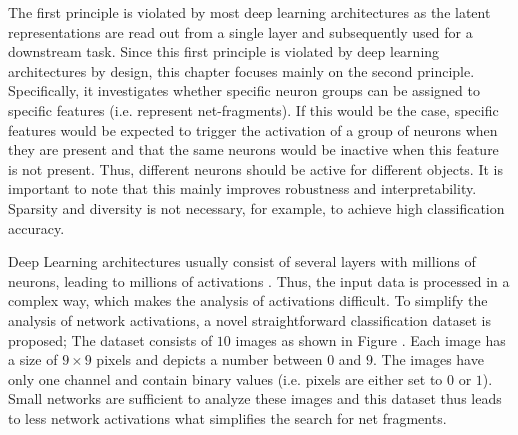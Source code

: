 
The first principle is violated by most deep learning architectures as the latent representations are read out from a single layer and subsequently used for a downstream task.
Since this first principle is violated by deep learning architectures by design, this chapter focuses mainly on the second principle. Specifically, it investigates whether specific neuron groups can be assigned to specific features (i.e. represent net-fragments). 
If this would be the case, specific features would be expected to trigger the activation of a group of neurons when they are present and that the same neurons would be inactive when this feature is not present. Thus, different neurons should be active for different objects.
It is important to note that this mainly improves robustness and interpretability. Sparsity and diversity is not necessary, for example, to achieve high classification accuracy.

Deep Learning architectures usually consist of several layers with millions of neurons, leading to millions of activations \cite{Szegedy_Liu_Jia_Sermanet_Reed_Anguelov_Erhan_Vanhoucke_Rabinovich_2014, He_Zhang_Ren_Sun_2016, Ronneberger_Fischer_Brox_2015, He_Gkioxari_Dollar_Girshick_2017, Liu_Anguelov_Erhan_Szegedy_Reed_Fu_Berg_2016, Redmon_Divvala_Girshick_Farhadi_2016}.
Thus, the input data is processed in a complex way, which makes the analysis of activations difficult.
To simplify the analysis of network activations, a novel straightforward classification dataset is proposed;
The dataset consists of $10$ images as shown in Figure .
Each image has a size of $9\times9$ pixels and depicts a number between $0$ and $9$.
The images have only one channel and contain binary values (i.e. pixels are either set to $0$ or $1$).
Small networks are sufficient to analyze these images and this dataset thus leads to less network activations what simplifies the search for net fragments.

